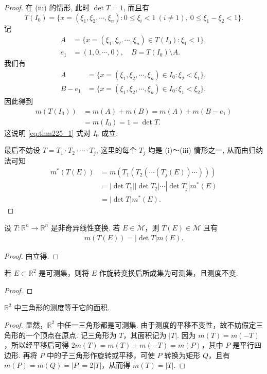 \documentclass[../../main.tex]{subfiles}
\begin{document}
\begin{proof}
在 (iii) 的情形, 此时 $\det T = 1$, 而且有
\[
T(I_0) = \{x = (\xi_1,\xi_2,\cdots,\xi_n): 0\leqslant\xi_i < 1\ (i\neq 1),\ 0\leqslant\xi_1 - \xi_2 < 1\}.
\]
记
\begin{align*}
A &= \{x = (\xi_1,\xi_2,\cdots,\xi_n)\in T(I_0): \xi_1 < 1\},\\
e_1 &= (1,0,\cdots,0),\quad B = T(I_0)\setminus A.
\end{align*}
我们有
\begin{align*}
A &= \{x = (\xi_1,\xi_2,\cdots,\xi_n)\in I_0: \xi_2 < \xi_1\},\\
B - e_1 &= \{x = (\xi_1,\xi_2,\cdots,\xi_n)\in I_0: \xi_1 < \xi_2\}.
\end{align*}
因此得到
\begin{align*}
m(T(I_0)) &= m(A) + m(B) = m(A) + m(B - e_1)\\
&= m(I_0) = 1 = \det T.
\end{align*}
这说明 \eqref{eq:thm225_1} 式对 $I_0$ 成立.

最后不妨设 $T = T_1\cdot T_2\cdot\cdots\cdot T_j$, 这里的每个 $T_j$ 均是 (i)～(iii) 情形之一, 从而由归纳法可知
\begin{align*}
m^*(T(E)) &= m(T_1(T_2(\cdots(T_j(E))\cdots)))\\
&= |\det T_1||\det T_2|\cdots|\det T_j|m^*(E)\\
&= |\det T|m^*(E).
\end{align*}

\end{proof}

\begin{corollary}
设 \(T:\mathbb{R}^n \to \mathbb{R}^n\) 是非奇异线性变换. 若 \(E \in \mathscr{M}\)，则 \(T(E)\in\mathscr{M}\) 且有
\begin{align*}
m(T(E)) = |\det T|m(E).
\end{align*}
\end{corollary}
\begin{proof}
由立得.

\end{proof}

\begin{example}
若 \(E \subset \mathbb{R}^2\) 是可测集，则将 \(E\) 作旋转变换后所成集为可测集，且测度不变.
\end{example}
\begin{proof}


\end{proof}

\begin{example}
\(\mathbb{R}^2\) 中三角形的测度等于它的面积.
\end{example}
\begin{proof}
显然，\(\mathbb{R}^2\) 中任一三角形都是可测集. 由于测度的平移不变性，故不妨假定三角形的一个顶点在原点. 记三角形为 \(T\)，其面积记为 \(|T|\). 因为 \(m(T)=m(-T)\)，所以经平移后可得 \(2m(T)=m(T)+m(-T)=m(P)\)，其中 \(P\) 是平行四边形. 再将 \(P\) 中的子三角形作旋转或平移，可使 \(P\) 转换为矩形 \(Q\)，且有 \(m(P)=m(Q)=|P| = 2|T|\)，从而得 \(m(T)=|T|\).

\end{proof}
\end{document}
